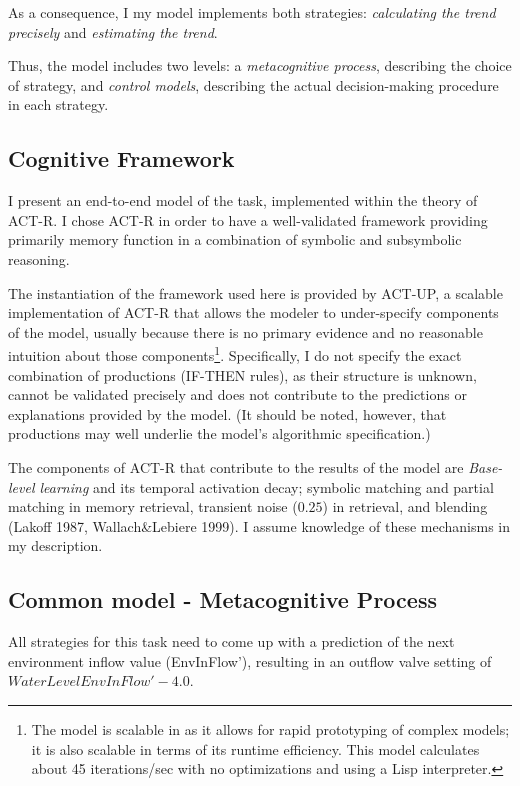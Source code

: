 \documentclass[twocolumn]{article}
\begin{document}
As a consequence, I my model implements both strategies: \emph{calculating the trend precisely} and \emph{estimating the trend}.

Thus, the model includes two levels:  a \emph{metacognitive process}, describing the choice of strategy, and \emph{control models}, describing the actual decision-making procedure in each strategy.


\subsection{Cognitive Framework}
\label{sec:cognitive-framework}

I present an end-to-end model of the task, implemented within the theory of ACT-R.  I chose ACT-R in order to have a well-validated framework providing primarily memory function in a combination of symbolic and subsymbolic reasoning. 

The instantiation of the framework used here is provided by ACT-UP, a scalable implementation of ACT-R that allows the modeler to under-specify components of the model, usually because there is no primary evidence and no reasonable intuition about those components\footnote{The model is scalable in as it allows for rapid prototyping of complex models; it is also scalable in terms of its runtime efficiency.  This model calculates about 45 iterations/sec with no optimizations and using a Lisp interpreter.}.  Specifically, I do not specify the exact combination of productions (IF-THEN rules), as their structure is unknown, cannot be validated precisely and does not contribute to the predictions or explanations provided by the model.  (It should be noted, however, that productions may well underlie the model's algorithmic specification.)

The components of ACT-R that contribute to the results of the model are \emph{Base-level learning} and its temporal activation decay; symbolic matching and partial matching in memory retrieval, transient noise ($0.25$) in retrieval, and blending (Lakoff 1987, Wallach\&Lebiere 1999).  I assume knowledge of these mechanisms in my description.


\subsection{Common model - Metacognitive Process}
\label{sec:common-model}


All strategies for this task need to come up with a prediction of the next environment inflow value (EnvInFlow'), resulting in an outflow valve setting of $WaterLevel EnvInFlow' - 4.0$.
\end{document}
